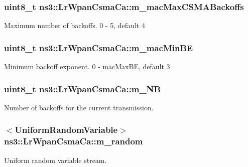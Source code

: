 \subsubsection[{\texorpdfstring{m\+\_\+mac\+Max\+C\+S\+M\+A\+Backoffs}{m_macMaxCSMABackoffs}}]{\setlength{\rightskip}{0pt plus 5cm}uint8\+\_\+t ns3\+::\+Lr\+Wpan\+Csma\+Ca\+::m\+\_\+mac\+Max\+C\+S\+M\+A\+Backoffs\hspace{0.3cm}{\ttfamily [private]}}\hypertarget{classns3_1_1LrWpanCsmaCa_afcd3646d791f66b115235dd662494ff3}{}\label{classns3_1_1LrWpanCsmaCa_afcd3646d791f66b115235dd662494ff3}
Maximum number of backoffs. 0 -\/ 5, default 4 
\subsubsection[{\texorpdfstring{m\+\_\+mac\+Min\+BE}{m_macMinBE}}]{\setlength{\rightskip}{0pt plus 5cm}uint8\+\_\+t ns3\+::\+Lr\+Wpan\+Csma\+Ca\+::m\+\_\+mac\+Min\+BE\hspace{0.3cm}{\ttfamily [private]}}\hypertarget{classns3_1_1LrWpanCsmaCa_a8e4fd67213592e79eda2550a1a03bf0c}{}\label{classns3_1_1LrWpanCsmaCa_a8e4fd67213592e79eda2550a1a03bf0c}
Minimum backoff exponent. 0 -\/ mac\+Max\+BE, default 3 
\subsubsection[{\texorpdfstring{m\+\_\+\+NB}{m_NB}}]{\setlength{\rightskip}{0pt plus 5cm}uint8\+\_\+t ns3\+::\+Lr\+Wpan\+Csma\+Ca\+::m\+\_\+\+NB\hspace{0.3cm}{\ttfamily [private]}}\hypertarget{classns3_1_1LrWpanCsmaCa_ae6fd2d3aa6c2f6ec043d9c6821932603}{}\label{classns3_1_1LrWpanCsmaCa_ae6fd2d3aa6c2f6ec043d9c6821932603}
Number of backoffs for the current transmission. 
\subsubsection[{\texorpdfstring{m\+\_\+random}{m_random}}]{$<${\bf Uniform\+Random\+Variable}$>$ ns3\+::\+Lr\+Wpan\+Csma\+Ca\+::m\+\_\+random\hspace{0.3cm}{\ttfamily [private]}}\hypertarget{classns3_1_1LrWpanCsmaCa_aeb5ed4af956db040c190aca3416b11ba}{}\label{classns3_1_1LrWpanCsmaCa_aeb5ed4af956db040c190aca3416b11ba}
Uniform random variable stream. 
